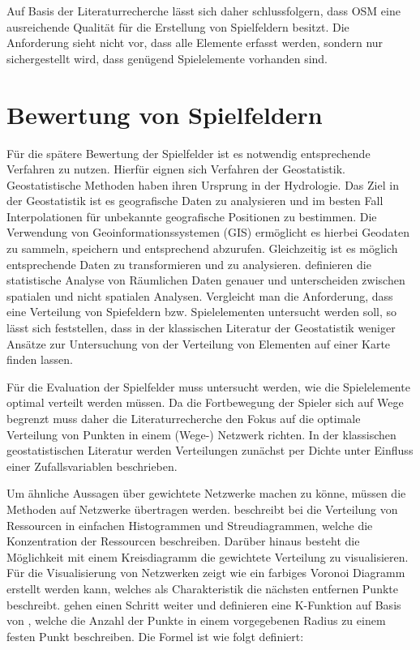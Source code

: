 Auf Basis der Literaturrecherche lässt sich daher schlussfolgern, dass OSM eine ausreichende Qualität für die Erstellung von Spielfeldern besitzt. Die Anforderung sieht nicht vor, dass alle Elemente erfasst werden, sondern nur sichergestellt wird, dass genügend Spielelemente vorhanden sind.



\section{Bewertung von Spielfeldern}
\label{ch3:s:geostatistik}

Für die spätere Bewertung der Spielfelder ist es notwendig entsprechende Verfahren zu nutzen.
Hierfür eignen sich Verfahren der Geostatistik. Geostatistische Methoden haben ihren Ursprung in der Hydrologie.\cite{Bloschl.2006}
Das Ziel in der Geostatistik ist es geografische Daten zu analysieren und im besten Fall Interpolationen für unbekannte geografische Positionen zu bestimmen.\cite{Liebhold.1993}
Die Verwendung von Geoinformationssystemen (GIS) ermöglicht es hierbei Geodaten zu sammeln, speichern und entsprechend abzurufen. Gleichzeitig ist es möglich entsprechende Daten zu transformieren und zu analysieren.\cite{Kitanidis.1997}
\textcite{Bailey.1995} definieren die statistische Analyse von Räumlichen Daten genauer und unterscheiden zwischen spatialen und nicht spatialen Analysen. Vergleicht man die Anforderung, dass eine Verteilung von Spiefeldern bzw. Spielelementen untersucht werden soll, so lässt sich feststellen, dass in der klassischen Literatur der Geostatistik weniger Ansätze zur Untersuchung von der Verteilung von Elementen auf einer Karte finden lassen.

Für die Evaluation der Spielfelder muss untersucht werden, wie die Spielelemente optimal verteilt werden müssen.
Da die Fortbewegung der Spieler sich auf Wege begrenzt muss daher die Literaturrecherche den Fokus auf die optimale Verteilung von Punkten in einem (Wege-) Netzwerk richten.
In der klassischen geostatistischen Literatur werden Verteilungen zunächst per Dichte unter Einfluss einer Zufallsvariablen beschrieben.\cite{Heinrich.1992}

Um ähnliche Aussagen über gewichtete Netzwerke machen zu könne, müssen die Methoden auf Netzwerke übertragen werden.
\textcite{Goovaerts.1997} beschreibt bei die Verteilung von Ressourcen in einfachen Histogrammen und Streudiagrammen, welche die Konzentration der Ressourcen beschreiben. Darüber hinaus besteht die Möglichkeit mit einem Kreisdiagramm die gewichtete Verteilung zu visualisieren.\cite{Diggle.2007}
Für die Visualisierung von Netzwerken zeigt \textcite{Okabe.2006} wie ein farbiges Voronoi Diagramm erstellt werden kann, welches als Charakteristik die nächsten entfernen Punkte beschreibt. \textcite{Spooner.2004} gehen einen Schritt weiter und definieren eine K-Funktion auf Basis von \textcite{Okabe.2001}, welche die Anzahl der Punkte in einem vorgegebenen Radius zu einem festen Punkt beschreiben.
Die Formel ist wie folgt definiert:

